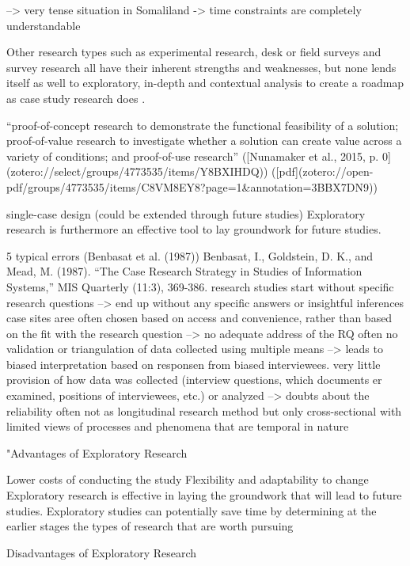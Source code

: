 --> very tense situation in Somaliland -> time constraints are completely understandable

Other research types such as experimental research, desk or field surveys and survey research all have their inherent strengths and weaknesses, but none lends itself as well to exploratory, in-depth and contextual analysis to create a roadmap as case study research does \autocite{pelzResearchMethodsSocial}.

“proof-of-concept research to demonstrate the functional feasibility of a solution; proof-of-value research to investigate whether a solution can create value across a variety of conditions; and proof-of-use research” ([Nunamaker et al., 2015, p. 0](zotero://select/groups/4773535/items/Y8BXIHDQ)) ([pdf](zotero://open-pdf/groups/4773535/items/C8VM8EY8?page=1&annotation=3BBX7DN9))

single-case design (could be extended through future studies)
Exploratory research is furthermore an effective tool to lay groundwork for future studies.

5 typical errors (Benbasat et al. (1987)) Benbasat, I., Goldstein, D. K., and Mead, M. (1987). “The Case Research Strategy in Studies of Information Systems,” MIS Quarterly (11:3), 369-386.
research studies start without specific research questions --> end up without any specific answers or insightful inferences
case sites aree often chosen based on access and convenience, rather than based on the fit with the research question --> no adequate address of the RQ
often no validation or triangulation of data collected using multiple means --> leads to biased interpretation based on responsen from biased interviewees.
very little provision of how data was collected (interview questions, which documents er examined, positions of interviewees, etc.) or analyzed --> doubts about the reliability
often not as longitudinal research method but only cross-sectional with limited views of processes and phenomena that are temporal in nature


"Advantages of Exploratory Research

    Lower costs of conducting the study
    Flexibility and adaptability to change
    Exploratory research is effective in laying the groundwork that will lead to future studies.
    Exploratory studies can potentially save time by determining at the earlier stages the types of research that are worth pursuing

Disadvantages of Exploratory Research

